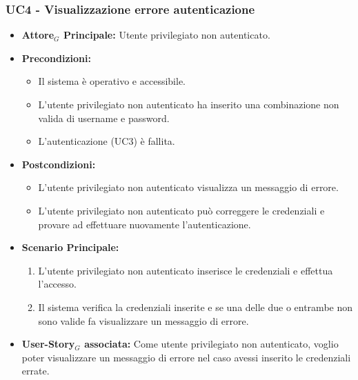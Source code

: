 \documentclass[11pt]{article}
\begin{document}
\begin{justify}
\subsubsection{\textbf{UC4 - Visualizzazione errore autenticazione}}
\begin{itemize}
    \item \textbf{Attore$_G$ Principale:} Utente privilegiato non autenticato.
    \item \textbf{Precondizioni:}
        \begin{itemize}
            \item Il sistema è operativo e accessibile.
            \item L'utente privilegiato non autenticato ha inserito una combinazione non valida di username e password.
            \item L'autenticazione (UC3) è fallita.
        \end{itemize}
    \item \textbf{Postcondizioni:}
        \begin{itemize}
            \item L’utente privilegiato non autenticato visualizza un messaggio di errore.
            \item L’utente privilegiato non autenticato può correggere le credenziali e provare ad effettuare nuovamente l'autenticazione.
        \end{itemize}
    \item \textbf{Scenario Principale:}
        \begin{enumerate}
            \item L'utente privilegiato non autenticato inserisce le credenziali e effettua l'accesso.
            \item Il sistema verifica la credenziali inserite e se una delle due o entrambe non sono valide fa visualizzare un messaggio di errore.
        \end{enumerate}
    \item \textbf{User-Story$_G$ associata:} Come utente privilegiato non autenticato, voglio poter visualizzare un messaggio di errore nel caso avessi inserito le credenziali errate.
\end{itemize}

\end{justify}
\end{document}
